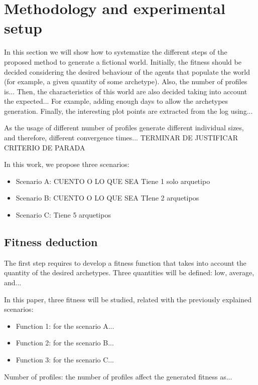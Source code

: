 \documentclass[runningheads,a4paper]{llncs}
\begin{document}
\section{Methodology and experimental setup} %
\label{sec:met}

In this section we will show how to systematize the different steps of the proposed method to generate a fictional world. Initially, the fitness should be decided considering the desired behaviour of the agents that populate the world (for example, a given quantity of some archetype). Also, the number of profiles is...  Then, the characteristics of this world are also decided taking into account the expected... For example, adding enough days to allow the archetypes generation. Finally, the interesting plot points are extracted from the log using... 

As the usage of different number of profiles generate different individual sizes, and therefore, different convergence times... TERMINAR DE JUSTIFICAR CRITERIO DE PARADA

In this work, we propose three scenarios:
\begin{itemize}
\item Scenario A: CUENTO O LO QUE SEA Tiene 1 solo arquetipo
\item Scenario B: CUENTO O LO QUE SEA TIene 2 arquetipos
\item Scenario C: Tiene 5 arquetipos
\end{itemize}

\subsection{Fitness deduction}

The first step requires to develop a fitness function that takes into account the quantity of the desired archetypes. Three quantities will be defined: low, average, and...

In this paper, three fitness will be studied, related with the previously explained scenarios:
\begin{itemize}
\item Function 1: for the scenario A...
\item Function 2: for the scenario B...
\item Function 3: for the scenario C...
\end{itemize}

Number of profiles: the number of profiles affect the generated fitness as...
\end{document}
